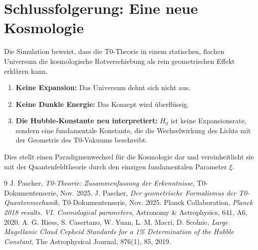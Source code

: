 \documentclass[12pt,a4paper]{article}
\begin{document}
	\section{Schlussfolgerung: Eine neue Kosmologie}
	Die Simulation beweist, dass die T0-Theorie in einem statischen, flachen Universum die kosmologische Rotverschiebung als rein geometrischen Effekt erklären kann.
	\begin{enumerate}
		\item \textbf{Keine Expansion:} Das Universum dehnt sich nicht aus.
		\item \textbf{Keine Dunkle Energie:} Das Konzept wird überflüssig.
		\item \textbf{Die Hubble-Konstante neu interpretiert:} $H_0$ ist keine Expansionsrate, sondern eine fundamentale Konstante, die die Wechselwirkung des Lichts mit der Geometrie des T0-Vakuums beschreibt.
	\end{enumerate}
	Dies stellt einen Paradigmenwechsel für die Kosmologie dar und vereinheitlicht sie mit der Quantenfeldtheorie durch den einzigen fundamentalen Parameter $\xi$.
	\begin{thebibliography}{9}
		J. Pascher, \textit{T0-Theorie: Zusammenfassung der Erkenntnisse}, T0-Dokumentenserie, Nov. 2025.
		J. Pascher, \textit{Der geometrische Formalismus der T0-Quantenmechanik}, T0-Dokumentenserie, Nov. 2025.
		Planck Collaboration, \textit{Planck 2018 results. VI. Cosmological parameters}, Astronomy \& Astrophysics, 641, A6, 2020.
		A. G. Riess, S. Casertano, W. Yuan, L. M. Macri, D. Scolnic, \textit{Large Magellanic Cloud Cepheid Standards for a 1\% Determination of the Hubble Constant}, The Astrophysical Journal, 876(1), 85, 2019.
	\end{thebibliography}
\end{document}
